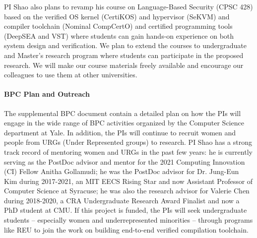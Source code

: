 PI Shao also plans to revamp his course on Language-Based Security
(CPSC 428) based on the verified OS kernel (CertiKOS) and hypervisor
(SeKVM) and compiler toolchain (Nominal CompCertO) and certified
programming tools (DeepSEA and VST) where students can gain hands-on
experience on both system design and verification. We plan to extend
the courses to undergraduate and Master's research program where
students can participate in the proposed research. We will make our
course materials freely available and encourage our colleagues to use
them at other universities.

\paragraph*{BPC Plan and Outreach}
The supplemental BPC document contain a detailed plan on how the PIs
will engage in the wide range of BPC activities organized by the
Computer Science department at Yale. In addition, the PIs will
continue to recruit women and people from URGs (Under Represented
groups) to research.  PI Shao has a strong track record of mentoring
women and URGs in the past few years: he is currently serving as the
PostDoc advisor and mentor for the 2021 Computing Innovation (CI)
Fellow Anitha Gollamudi; he was the PostDoc advisor for Dr. Jung-Eun
Kim during 2017-2021, an MIT EECS Rising Star and now Assistant
Professor of Computer Science at Syracuse; he was also the research
advisor for Valerie Chen during 2018-2020, a CRA Undergraduate
Research Award Finalist and now a PhD student at CMU.  If this project
is funded, the PIs will seek undergraduate students – especially women
and underrepresented minorities – through programs like REU to join
the work on building end-to-end verified compilation toolchain.


